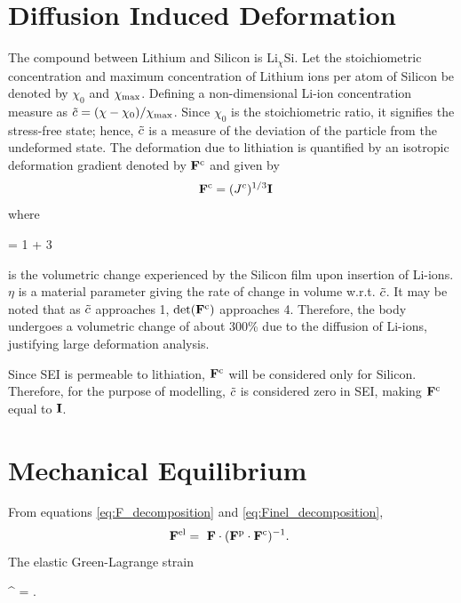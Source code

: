 \section{Diffusion Induced Deformation}
The compound between Lithium and Silicon is $\text{Li}_{\chi}$Si. Let the stoichiometric concentration and maximum concentration of Lithium ions per atom of Silicon be denoted by $\chi_0$ and $\chi_{\rm{max}}$. Defining a non-dimensional Li-ion concentration measure as $\tilde{c} = (\chi-\chi_{0})/\chi_{{\rm{max}}}$. Since $\chi_{0}$ is the stoichiometric ratio, it signifies the stress-free state; hence, $\tilde{c}$ is a measure of the deviation of the particle from the undeformed state. The deformation due to lithiation is quantified by an isotropic deformation gradient denoted by $\mathbf{F}^{\rm{c}}$ and given by
\begin{gather}
    \F^\c = (\jc)^{1/3} \I
\end{gather}
where \begin{nonumbereq}\jc = 1 + 3 \eta \xmax \tc\end{nonumbereq} is the volumetric change experienced by the Silicon film upon insertion of Li-ions. $\eta$ is a material parameter giving the rate of change in volume w.r.t. $\tilde{c}$. It may be noted that as $\tilde{c}$ approaches 1, $\mathrm{det}(\mathbf{F}^{\rm{c}})$ approaches 4. Therefore, the body undergoes a volumetric change of about 300\% due to the diffusion of Li-ions, justifying large deformation analysis.

Since SEI is permeable to lithiation, $\mathbf{F}^{\rm{c}}$ will be considered only for Silicon. Therefore, for the purpose of modelling, $\tilde{c}$ is considered zero in SEI, making $\mathbf{F}^{\rm{c}}$ equal to $\mathbf{I}$.
\section{Mechanical Equilibrium } \label{section:MechEqbm}
From equations \ref{eq:F_decomposition} and \ref{eq:Finel_decomposition},
\begin{align}
    \F^{\el} &=  \F \cdot \inv{\F^{\p} \cdot \F^{\c}}. \label{eq:Fel_tensor}
\end{align}
The elastic Green-Lagrange strain
\begin{nonumbereq}
\E^{\el} =  \left[ (\F^\el)^\T \cdot  \F^\el - \I \right].
\end{nonumbereq}


